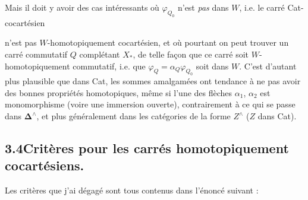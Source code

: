 \documentclass[11pt]{article}
\newcommand{\msp}[1]{\marginpar{\footnotesize [#1]}}
\begin{document}
Mais il doit y avoir des cas intéressants où $\varphi_{Q_0}$ n'est \textit{pas} dans $W$, i.e. le carré Cat-cocartésien
n'est pas $W$-homotopiquement cocartésien, et où pourtant on peut trouver un carré commutatif $Q$
\msp{page 146}complétant $X_*$, de telle façon que ce carré soit $W$-homotopiquement commutatif, i.e. que $\varphi_Q = \alpha_Q \varphi_{Q_0}$ soit dans $W$. C'est d'autant plus plausible que dans Cat, les sommes amalgamées ont tendance à ne pas avoir des bonnes propriétés homotopiques, même si l'une des flèches $\alpha_1$, $\alpha_2$ est monomorphisme (voire une immersion ouverte), contrairement à ce qui se passe dans $\boldsymbol{\Delta}^\wedge$, et plus généralement dans les catégories de la forme $Z^\wedge$ ($Z$ dans Cat).

\subsection*{3.4\quad Critères pour les carrés homotopiquement cocartésiens.}

Les critères que j'ai dégagé sont tous contenus dans l'énoncé suivant :
\end{document}

